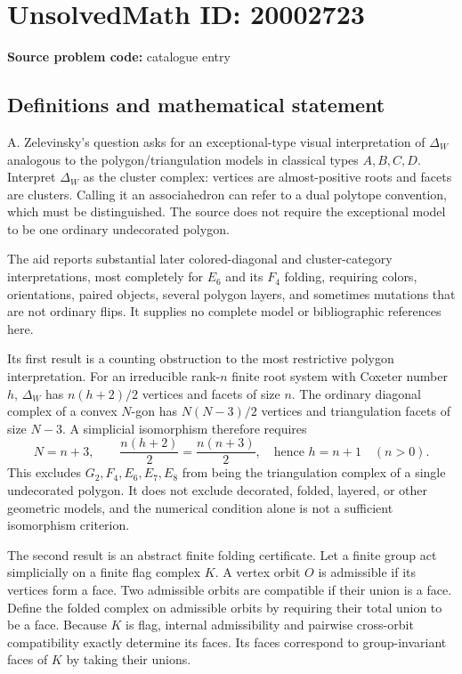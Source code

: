 \documentclass[11pt]{article}
\begin{document}
\section*{UnsolvedMath ID: 20002723}
\textbf{Source problem code:} catalogue entry
\subsection{Definitions and mathematical statement}
A. Zelevinsky's question asks for an exceptional-type visual interpretation of $\Delta_W$ analogous to the polygon/triangulation models in classical types $A,B,C,D$. Interpret $\Delta_W$ as the cluster complex: vertices are almost-positive roots and facets are clusters. Calling it an associahedron can refer to a dual polytope convention, which must be distinguished. The source does not require the exceptional model to be one ordinary undecorated polygon.

The aid reports substantial later colored-diagonal and cluster-category interpretations, most completely for $E_6$ and its $F_4$ folding, requiring colors, orientations, paired objects, several polygon layers, and sometimes mutations that are not ordinary flips. It supplies no complete model or bibliographic references here.

Its first result is a counting obstruction to the most restrictive polygon interpretation. For an irreducible rank-$n$ finite root system with Coxeter number $h$, $\Delta_W$ has $n(h+2)/2$ vertices and facets of size $n$. The ordinary diagonal complex of a convex $N$-gon has $N(N-3)/2$ vertices and triangulation facets of size $N-3$. A simplicial isomorphism therefore requires
\[
 N=n+3,\qquad \frac{n(h+2)}2=\frac{n(n+3)}2,
 \quad\text{hence }h=n+1\quad(n>0).
\]
This excludes $G_2,F_4,E_6,E_7,E_8$ from being the triangulation complex of a single undecorated polygon. It does not exclude decorated, folded, layered, or other geometric models, and the numerical condition alone is not a sufficient isomorphism criterion.

The second result is an abstract finite folding certificate. Let a finite group act simplicially on a finite flag complex $K$. A vertex orbit $O$ is admissible if its vertices form a face. Two admissible orbits are compatible if their union is a face. Define the folded complex on admissible orbits by requiring their total union to be a face. Because $K$ is flag, internal admissibility and pairwise cross-orbit compatibility exactly determine its faces. Its faces correspond to group-invariant faces of $K$ by taking their unions.
\end{document}
